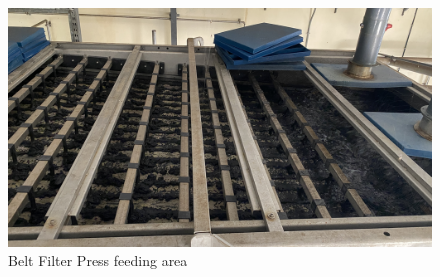 \begin{figure}[H]
\centering
\includegraphics[width=1\linewidth]{material_and_methodology/Beltpress feeding area.JPG}
\caption{Belt Filter Press feeding area}
\label{fig:Beltpress_Feeding_area}
\end{figure}